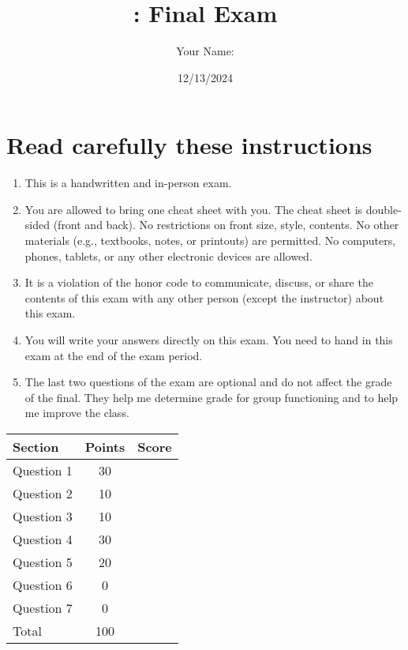 \documentclass[10pt]{article}
\author{Your Name:}
\date{12/13/2024}
\title{\classname{}: Final Exam}
\begin{document}
\maketitle
\section*{Read carefully these instructions}

\begin{enumerate}
\item This is a handwritten and in-person exam. 

\item You are allowed to bring one cheat sheet with you. The cheat sheet is double-sided (front and back).  No restrictions on front size, style, contents.  No other materials (e.g., textbooks, notes, or printouts) are permitted. No computers, phones, tablets, or any other electronic devices are allowed.

\item It is a violation of the honor code to communicate, discuss, or share the contents of this exam with any other person (except the instructor) about this exam.

\item You will write your answers directly on this exam.  You need to hand in this exam at the end of the exam period. 

\item The last two questions of the exam are optional and do not affect the grade of the final.  They help me determine grade for group functioning and to help me improve the class.
  
\end{enumerate}


\begin{center}
  \begin{tabular}{lcc}
    \toprule
    Section		&	Points	&	Score \\
    \midrule
    Question 1	&	 30	& \\
    Question 2	&	 10	& \\
    Question 3 	&	 10	& \\
    Question 4 	&	 30	& \\
    Question 5 	&	 20	& \\
    Question 6 	&	 0	& \\
    Question 7 	&	 0	& \\
    \midrule
    Total		&	100	& \\
    \bottomrule
  \end{tabular}
\end{center}
\end{document}
